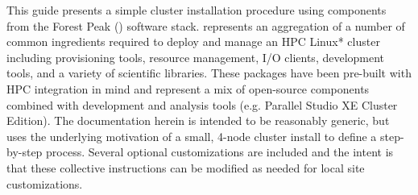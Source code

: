 This guide presents a simple cluster installation procedure using components
from the Forest Peak (\FSP{}) software stack. \FSP{} represents an aggregation of a number of
common ingredients required to deploy and manage an HPC Linux* cluster including
provisioning tools, resource management, I/O clients, development tools, and a variety of
scientific libraries. These packages have been pre-built with HPC integration
in mind and represent a mix of open-source components combined with \Intel{}
development and analysis tools (e.g. \Intel{} Parallel Studio XE Cluster Edition).
The documentation herein is intended to be reasonably generic, but uses the
underlying motivation of a small, 4-node cluster install to define a step-by-step
process. Several optional customizations are included and the intent is that
these collective instructions can be modified as needed for local site
customizations. 
